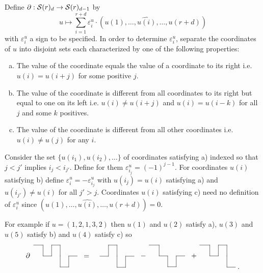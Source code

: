 \documentclass[thesis.tex]{subfiles}
\begin{document}
Define $\partial:\S(r)_d\to\S(r)_{d-1}$ by $$u\mapsto \sum_{i=1}^{r+d}\varepsilon^u_{i}\cdot(u(1),\dotsc,\widehat{u(i)},\dotsc,u(r+d))$$ with $\varepsilon^u_{i}$ a sign to be specified. In order to determine $\varepsilon^u_{i}$, separate the coordinates of $u$ into disjoint sets each characterized by one of the following properties:
\begin{enumerate}[a)]
\item The value of the coordinate equals the value of a coordinate to its right i.e. $u(i)=u(i+j)$ for some positive $j$.
\item The value of the coordinate is different from all coordinates to its right but equal to one on its left i.e. $u(i)\neq u(i+j)$ and $u(i)=u(i-k)$ for all $j$ and some $k$ positives.
\item The value of the coordinate is different from all other coordinates i.e. $u(i)\neq u(j)$ for any $i$.
\end{enumerate}
Consider the set $\{u(i_1), u(i_2),\dotsc\}$ of coordinates satisfying a) indexed so that $j<j'$ implies $i_j < i_{j'}$. Define for them $\varepsilon^u_{i_j}=(-1)^{j-1}$. For coordinates $u(i)$ satisfying b) define $\varepsilon^u_{i}=-\varepsilon^u_{i_j}$ with $u(i_j)=u(i)$ satisfying a) and $u(i_{j'})\neq u(i)$ for all $j'>j$. Coordinates $u(i)$ satisfying c) need no definition of $\varepsilon^u_{i}$ since $(u(1),\dotsc,\widehat{u(i)},\dotsc,u(r+d))=0.$

For example if $u=(1,2,1,3,2)$ then $u(1)$ and $u(2)$ satisfy a), $u(3)$ and $u(5)$ satisfy b) and $u(4)$ satisfy c) so
$$
\xymatrix@C=1pc@R=.5pc{
 \ \ \ar@{-}[r] & \t\ar@{-}[d] & \t\ar@{-}[r] & \t\ar@{-}[d] & \t & \t  \\
\partial \  & \t\ar@{-}[r] & \t\ar@{-}[u] & \t\ar@{-}[d] & \t\ar@{-}[r] &  \\
\t & \t & \t & \t\ar@{-}[r] & \t\ar@{-}[u] &  }
\xymatrix@C=1pc@R=.65pc{
 & \t & \t\ar@{-}[r] & \t\ar@{-}[d] & \t & \t  \\
= & \t\ar@{-}[r] & \t\ar@{-}[u] & \t\ar@{-}[d] & \t\ar@{-}[r] &  \\
\t & \t & \t & \t\ar@{-}[r] & \t\ar@{-}[u] &  }
\xymatrix@C=1pc@R=.5pc{
 \ \ \ar@{-}[r] & \t\ar@{-}[d] & \t & \t & \t  \\
- \  & \t\ar@{-}[r] & \t\ar@{-}[d] & \t\ar@{-}[r] &  \\
\t & \t & \t\ar@{-}[r] & \t\ar@{-}[u] &  }
\xymatrix@C=1pc@R=.5pc{
 \ \ \ar@{-}[r] & \t\ar@{-}[d] & \t\ar@{-}[r] & \t\ar@{-}[d] & \t \\
+ \  & \t\ar@{-}[r] & \t\ar@{-}[u] & \t\ar@{-}[d] &  \\
\t & \t & \t & \t\ar@{-}[r] & . }
$$
\end{document}
